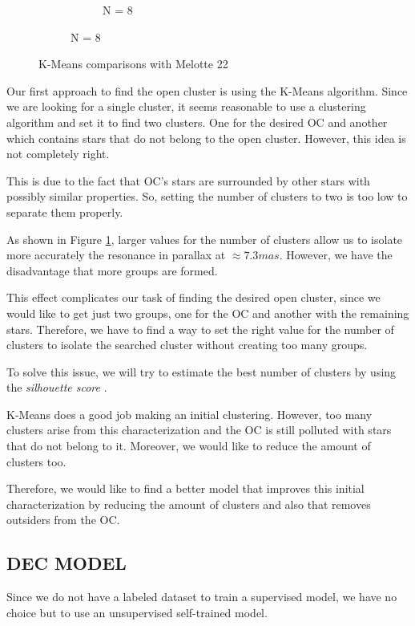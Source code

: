\documentclass[11pt,a4paper,USenglish,twocolumn]{article}
\begin{document}
\begin{figure}[htbp]
\begin{subfigure}{\columnwidth}
\begin{subfigure}[t]{0.3\textwidth}
      \caption{N = 8}
    \end{subfigure}
  \end{subfigure}
  \caption{K-Means comparisons with Melotte 22}
  \label{fig:kmeans_comparisons_melotte_22}
\end{figure}

Our first approach to find the open cluster is using the K-Means algorithm.
Since we are looking for a single cluster, it seems reasonable to use a clustering
algorithm and set it to find two clusters. One for the desired OC and another which
contains stars that do not belong to the open cluster.
However, this idea is not completely right.

This is due to the fact that OC's stars are surrounded by other stars with possibly similar
properties. So, setting the number of clusters to two is too low to separate them properly.

As shown in Figure \ref{fig:kmeans_comparisons_melotte_22}, larger values for the number of
clusters allow us to isolate more accurately the resonance in parallax at $\approx 7.3mas$.
However, we have the disadvantage that more groups are formed.

This effect complicates our task of finding the desired open cluster, since we would like
to get just two groups, one for the OC and another with the remaining stars.
Therefore, we have to find a way to set the right value for the number of clusters
to isolate the searched cluster without creating too many groups.

To solve this issue, we will try to estimate the best number of clusters by using the
\emph{silhouette score} \cite{rousseeuw1987silhouettes}.

K-Means does a good job making an initial clustering. However, too many clusters arise
from this characterization and the OC is still polluted with stars that do not belong to it.
Moreover, we would like to reduce the amount of clusters too.

Therefore, we would like to find a better model that improves this initial characterization
by reducing the amount of clusters and also that removes outsiders from the OC.

\subsection{DEC MODEL}

Since we do not have a labeled dataset to train a supervised model,
we have no choice but to use an unsupervised self-trained model.
\end{document}
